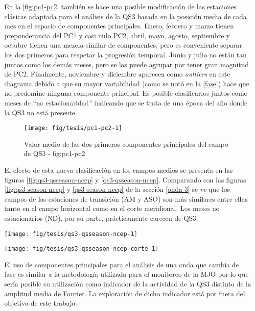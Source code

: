 \documentclass[spanish,a4paper]{book}
\begin{document}
En la \autoref{fig:pc1-pc2} también se hace una posible modificación de
las estaciones clásicas adaptada para el análisis de la QS3 basada en la
posición media de cada mes en el espacio de componentes principales.
Enero, febrero y marzo tienen preponderancia del PC1 y casi nulo PC2,
abril, mayo, agosto, septiembre y octubre tienen una mezcla similar de
componentes, pero es conveniente separar los dos primeros para respetar
la progresión temporal. Junio y julio no están tan juntos como los demás
meses, pero se los puede agrupar por tener gran magnitud de PC2.
Finalmente, noviembre y diciembre aparecen como \emph{outliers} en este
diagrama debido a que su mayor variabilidad (como se notó en la
\autoref{fase}) hace que no predomine ninguna componente principal. Es
posible clasificarlos juntos como meses de ``no estacionaridad''
indicando que se trata de una época del año donde la QS3 no está
presente.

\begin{figure}
\texttt{[image: fig/tesis/pc1-pc2-1]} \caption{Valor medio de las dos primeras componentes principales del campo de QS3 - fig:pc1-pc2}\label{fig:pc1-pc2}
\end{figure}

El efecto de esta nueva clasificación en los campos medios se presenta
en las figuras \ref{fig:qs3-qsseason-ncep} y \ref{qs3-qsseason-ncep}.
Comparando con las figuras \ref{fig:qs3-season-ncep} y
\ref{qs3-season-ncep} de la sección \ref{onda-3} se ve que los campos de
las estaciones de transición (AM y ASO) son más similares entre ellas
tanto en el campo horizontal como en el corte meridional. Los meses no
estacionarios (ND), por su parte, prácticamente carecen de QS3.

\begin{figure*}
\texttt{[image: fig/tesis/qs3-qsseason-ncep-1]} \caption{Media de reconstrucción de onda 3 en 300hPa - fig:qs3-qsseason-ncep}\label{fig:qs3-qsseason-ncep}
\end{figure*}

\begin{figure*}
\texttt{[image: fig/tesis/qs3-qsseason-ncep-corte-1]} \caption{Corte - fig:qs3-qsseason-ncep-corte}\label{fig:qs3-qsseason-ncep-corte}
\end{figure*}

El uso de componentes principales para el análisis de una onda que
cambia de fase es similar a la metodología utilizada para el monitoreo
de la MJO por lo que sería posible su utilización como
indicador de la actividad de la QS3 distinto de la amplitud media de
Fourier. La exploración de dicho indicador está por fuera del objetivo
de este trabajo.
\end{document}

